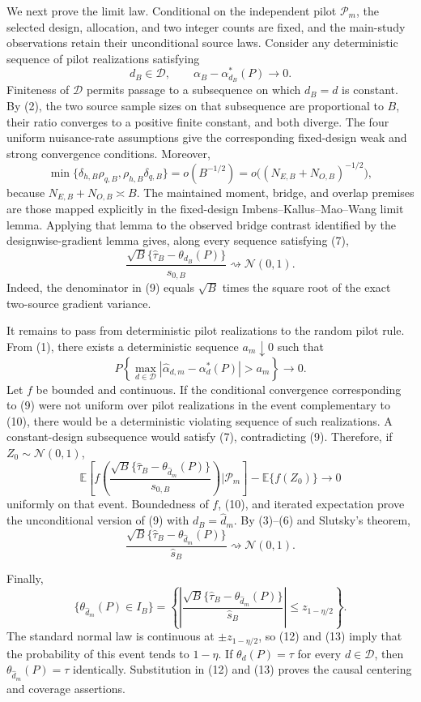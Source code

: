 We next prove the limit law.  Conditional on the independent pilot \(\mathcal P_m\), the selected design, allocation, and two integer counts are fixed, and the main-study observations retain their unconditional source laws.  Consider any deterministic sequence of pilot realizations satisfying
\[
 d_B\in\mathcal D,
 \qquad
 \alpha_B-\alpha_{d_B}^*(P)\longrightarrow0.                   \tag{7}
\]
Finiteness of \(\mathcal D\) permits passage to a subsequence on which \(d_B=d\) is constant.  By (2), the two source sample sizes on that subsequence are proportional to \(B\), their ratio converges to a positive finite constant, and both diverge.  The four uniform nuisance-rate assumptions give the corresponding fixed-design weak and strong convergence conditions.  Moreover,
\[
 \min\{\delta_{h,B}\rho_{q,B},
        \rho_{h,B}\delta_{q,B}\}=o(B^{-1/2})
 =o\bigl((N_{E,B}+N_{O,B})^{-1/2}\bigr),                       \tag{8}
\]
because \(N_{E,B}+N_{O,B}\asymp B\).  The maintained moment, bridge, and overlap premises are those mapped explicitly in the fixed-design Imbens--Kallus--Mao--Wang limit lemma.  Applying that lemma to the observed bridge contrast identified by the designwise-gradient lemma gives, along every sequence satisfying (7),
\[
 \frac{\sqrt B\{\widehat\tau_B-\theta_{d_B}(P)\}}{s_{0,B}}
 \rightsquigarrow\mathcal N(0,1).                              \tag{9}
\]
Indeed, the denominator in (9) equals \(\sqrt B\) times the square root of the exact two-source gradient variance.

It remains to pass from deterministic pilot realizations to the random pilot rule.  From (1), there exists a deterministic sequence \(a_m\downarrow0\) such that
\[
 P\left\{\max_{d\in\mathcal D}
 |\widehat\alpha_{d,m}-\alpha_d^*(P)|>a_m\right\}\longrightarrow0. \tag{10}
\]
Let \(f\) be bounded and continuous.  If the conditional convergence corresponding to (9) were not uniform over pilot realizations in the event complementary to (10), there would be a deterministic violating sequence of such realizations.  A constant-design subsequence would satisfy (7), contradicting (9).  Therefore, if \(Z_0\sim\mathcal N(0,1)\),
\[
\mathbb E\left[
 f\left(
 \frac{\sqrt B\{\widehat\tau_B-\theta_{\widehat d_m}(P)\}}
 {s_{0,B}}
 \right)\mathrel{\Big|}\mathcal P_m\right]
 -\mathbb E\{f(Z_0)\}\longrightarrow0                          \tag{11}
\]
uniformly on that event.  Boundedness of \(f\), (10), and iterated expectation prove the unconditional version of (9) with \(d_B=\widehat d_m\).  By (3)--(6) and Slutsky's theorem,
\[
 \frac{\sqrt B\{\widehat\tau_B-
 \theta_{\widehat d_m}(P)\}}{\widehat s_B}
 \rightsquigarrow\mathcal N(0,1).                              \tag{12}
\]

Finally,
\[
 \{\theta_{\widehat d_m}(P)\in I_B\}
 =\left\{
 \left|\frac{\sqrt B\{\widehat\tau_B-
 \theta_{\widehat d_m}(P)\}}{\widehat s_B}\right|
 \le z_{1-\eta/2}\right\}.                                    \tag{13}
\]
The standard normal law is continuous at \(\pm z_{1-\eta/2}\), so (12) and (13) imply that the probability of this event tends to \(1-\eta\).  If \(\theta_d(P)=\tau\) for every \(d\in\mathcal D\), then \(\theta_{\widehat d_m}(P)=\tau\) identically.  Substitution in (12) and (13) proves the causal centering and coverage assertions.